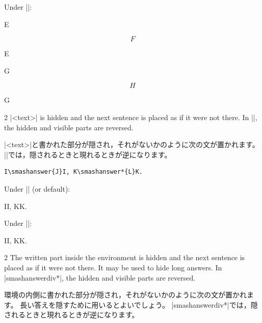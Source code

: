 \documentclass[%
fleqn,%
paper=a4paper,%
fontsize=10pt,%
open_bracket_pos=zenkakunibu_nibu,%
hanging_punctuation,%
]%
{jlreq}
\newenvironment{translateing}%
{\begin{multicolpar}{2}}
{\end{multicolpar}\vspace{\baselineskip}}
\DeclareRobustCommand{\commandtojskip}{\hspace{2.40554pt plus 1.49994pt minus 0.59998pt}}
\begin{document}
\hspace*{0.14\textwidth}Under |\sethideanswer|:\\
\sethideanswer
\begin{macroexample}
E
\begin{hideanswerdiv}
\[F\]
\end{hideanswerdiv}%
E

G
\begin{hideanswerdiv*}
\[H\]
\end{hideanswerdiv*}%
G
\end{macroexample}

\newpage
{}

\begin{translateing}
|<text>| is hidden and the next sentence is placed as if it were not there. In ||, the hidden and visible parts are reversed.

|<text>|\commandtojskip と書かれた部分が隠され，それがないかのように次の文が置かれます。
||\commandtojskip では，隠されるときと現れるときが逆になります。
\end{translateing}

\begin{lstlisting}
I\smashanswer{J}I, K\smashanswer*{L}K.
\end{lstlisting}

\hspace*{0.14\textwidth}Under |\unsethideanswer| (or default):\\
\unsethideanswer
\begin{macroexample}
II, KK.
\end{macroexample}

\hspace*{0.14\textwidth}Under |\sethideanswer|:\\
\sethideanswer
\begin{macroexample}
II, KK.
\end{macroexample}

\newpage
{}

\begin{translateing}
The written part inside the environment is hidden and the next sentence is placed as if it were not there.
It may be used to hide long answers.
In |smashanswerdiv*|, the hidden and visible parts are reversed.

環境の内側に書かれた部分が隠され，それがないかのように次の文が置かれます。
長い答えを隠すために用いるとよいでしょう。
|smashanswerdiv*|\commandtojskip では，隠されるときと現れるときが逆になります。
\end{translateing}
\end{document}
